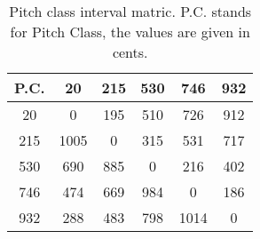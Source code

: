 \begin{table}
\begin{tabular}{c||  c  c  c  c  c  }	
P.C. & 20 & 215 & 530 & 746 & 932 \\
\hline
\hline
20 & 0 & 195 & 510 & 726 & 912\\
215 & 1005 & 0 & 315 & 531 & 717\\
530 & 690 & 885 & 0 & 216 & 402\\
746 & 474 & 669 & 984 & 0 & 186\\
932 & 288 & 483 & 798 & 1014 & 0     	
\end{tabular}
\label{tbl:pitch_class_interval_matrix}
\caption{Pitch class interval matric. P.C. stands for Pitch Class, the values are given in cents.}
\end{table}
